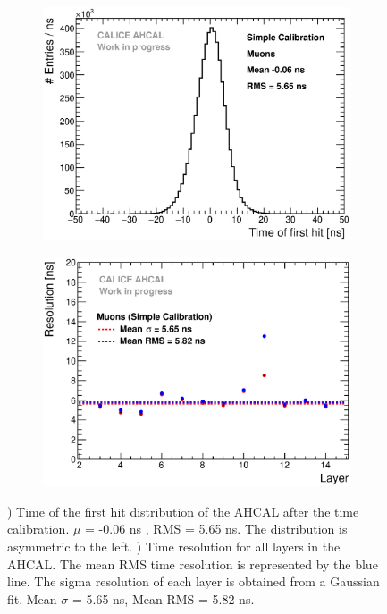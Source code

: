 \begin{figure}[htbp!]
	\begin{subfigure}[t]{0.49\textwidth}
		\centering
		\includegraphics[width=1\textwidth]{../Thesis_Plots/Timing/Muons/Plots/Timing_AHCAL_noCorrections.eps}
		\caption{}\label{fig:timing_nocorrection}
	\end{subfigure}
	\hfill
	\begin{subfigure}[t]{0.49\textwidth}
		\centering
		\includegraphics[width=1\textwidth]{../Thesis_Plots/Timing/Muons/Plots/ResolutionPerModule_noCorrections.eps}
		\caption{}\label{fig:reso_nocorrection}
	\end{subfigure}
	\caption{) Time of the first hit distribution of the AHCAL after the time calibration. $\mu$ = -0.06 ns , RMS = 5.65 ns. The distribution is asymmetric to the left. ) Time resolution for all layers in the AHCAL. The mean RMS time resolution is represented by the blue line. The sigma resolution of each layer is obtained from a Gaussian fit. Mean $\sigma$ = 5.65 ns, Mean RMS = 5.82 ns.}
\end{figure}

